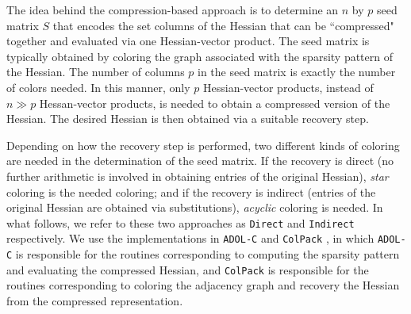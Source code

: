 \documentclass[final,leqno,onefignum,onetabnum]{siamart}
\begin{document}
The idea behind the compression-based approach is to determine an $n$ by $p$ seed matrix $S$
that encodes the set columns of the Hessian that can be ``compressed" together and evaluated via one Hessian-vector product. The seed matrix is typically obtained by
coloring the graph associated with the sparsity pattern of the Hessian. 
The number of columns $p$ in the seed matrix is exactly the number of colors needed. 
In this manner, only $p$ Hessian-vector products, instead of $n \gg p$ Hessan-vector products, is needed to obtain a compressed version of the Hessian. The desired Hessian is then obtained via a suitable recovery step.  

Depending on how the recovery step is performed, two different kinds of coloring are needed in the determination of the seed matrix. If the recovery is direct (no further arithmetic is involved in obtaining entries of the original Hessian),  {\em star} coloring is the needed coloring;
and if the recovery is indirect (entries of the original Hessian are obtained via substitutions), {\em acyclic} coloring is needed. In what follows, we refer to these two approaches  as {\tt Direct} and {\tt Indirect} respectively. We use the implementations in {\tt ADOL-C} \cite{walther2009getting} and {\tt ColPack} \cite{gebremedhin2013colpack}, in which {\tt ADOL-C} is responsible for the routines corresponding to computing the sparsity pattern and evaluating the compressed Hessian, and {\tt ColPack} is responsible for the routines  corresponding to coloring the adjacency graph and recovery the Hessian from the compressed representation.
\end{document}
